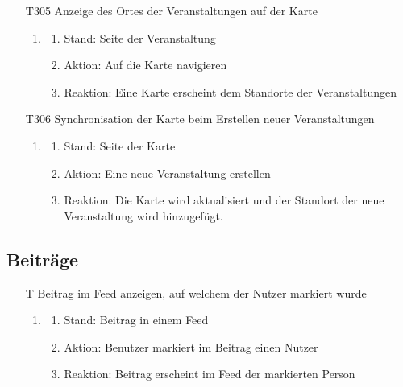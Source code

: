 \documentclass[parskip=full]{scrartcl}
\begin{document}
\begin{itemize}
			\item[T305] Anzeige des Ortes der Veranstaltungen auf der Karte
			\begin{enumerate}
				\item
				
				\begin{enumerate}[nosep]
					\item Stand: Seite der Veranstaltung
					\item Aktion: Auf die Karte navigieren
					\item Reaktion: Eine Karte erscheint dem Standorte der Veranstaltungen
					
				\end{enumerate}
			\end{enumerate}
			
			\item[T306] Synchronisation der Karte beim Erstellen neuer Veranstaltungen
			\begin{enumerate}
				\item
				
				\begin{enumerate}[nosep]
					\item Stand: Seite der Karte
					\item Aktion: Eine neue Veranstaltung erstellen
					\item Reaktion: Die Karte wird aktualisiert und der Standort der neue Veranstaltung wird  hinzugefügt.
					
				\end{enumerate}
			\end{enumerate}
		
		\end{itemize}
	
	
	
	\subsection{Beiträge}
	
		\begin{itemize}
			\item[T] Beitrag im Feed anzeigen, auf welchem der Nutzer markiert wurde
\begin{enumerate}
	\item
	\begin{enumerate}[nosep]	
	\item Stand:  Beitrag in einem Feed
	\item Aktion: Benutzer markiert im Beitrag einen Nutzer
	\item Reaktion: Beitrag erscheint im Feed der markierten Person
\end{enumerate} 
\end{enumerate} 
		\end{itemize}
\end{document}
